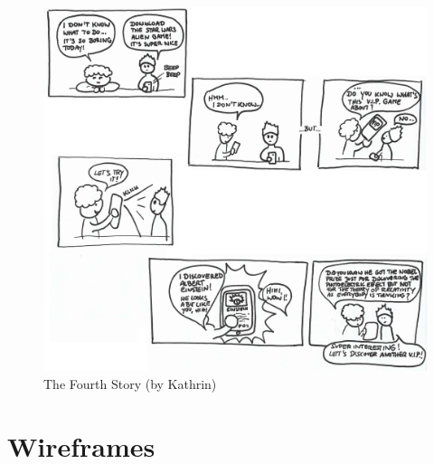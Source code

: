 \documentclass[12pt]{scrartcl}
\begin{document}
	\begin{figure}[H]
        		\centering
       		\includegraphics[width=\textwidth]{../images/story4.jpg}
       		\caption{The Fourth Story (by Kathrin)}
        		\label{story4}
	\end{figure}
	

\section{Wireframes}

	
\end{document}
